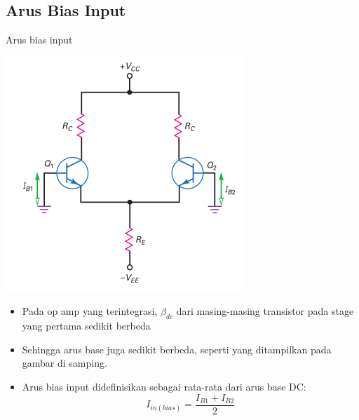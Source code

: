 \documentclass[aspectratio=169]{beamer}
\begin{document}
\subsection{Arus Bias Input}
\begin{frame}{Arus bias input}
	\begin{multicols}{2}
		\begin{center}
			\includegraphics[height=0.7\textheight]{gambar/01.different_base_currents}
		\end{center}
		\columnbreak
		\begin{itemize}
			\item Pada op amp yang terintegrasi, $ \beta_{dc} $ dari masing-masing transistor pada stage yang pertama sedikit berbeda
			\item Sehingga arus base juga sedikit berbeda, seperti yang ditampilkan pada gambar di samping.
			\item Arus bias input didefinisikan sebagai rata-rata dari arus base DC:
			\begin{equation}
				I_{in(bias)} = \frac{I_{B1} + I_{B2}}{2}
			\end{equation}
		\end{itemize}
	\end{multicols}
\end{frame}
\end{document}
